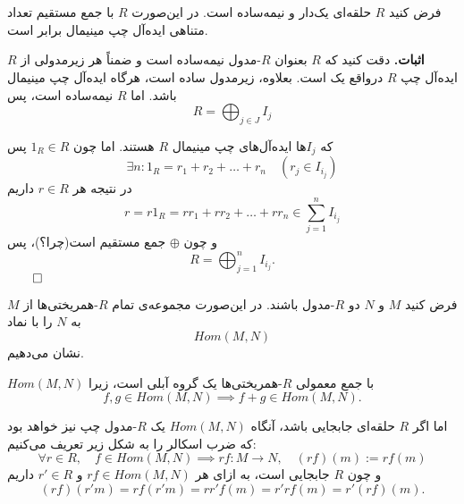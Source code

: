 \section{}


\begin{frame}
    \begin{theorem}
        فرض کنید \( R \) حلقه‌ای یک‌دار و نیمه‌ساده است. در این‌صورت \( R \) با جمع مستقیم تعداد متناهی ایده‌آل چپ مینیمال برابر است.
    \end{theorem}

    \textbf{اثبات.} دقت کنید که \( R \) بعنوان \( R \)-مدول نیمه‌ساده است و ضمناً هر زیرمدولی از \( R \) ایده‌آل چپ
    \( R \)
    درواقع یک
    است.
    بعلاوه، زیرمدول ساده است، هرگاه ایده‌آل چپ مینیمال باشد.
    اما
    \( R \) نیمه‌ساده‌ است، پس
    \[
        R = \bigoplus_{j \in J} I_j
    \]

\end{frame}

\begin{frame}
    که \( I_j \)ها ایده‌آل‌های چپ مینیمال \( R \) هستند. اما چون \( 1_R \in R \) پس
    \[
        \exists n : 1_R = r_1 + r_2 + \dots + r_n \quad (r_j \in I_{i_j})
    \]
    در نتیجه هر \( r \in R \) داریم
    \[
        r = r 1_R = r r_1 + r r_2 + \dots + r r_n \in \sum_{j=1}^n I_{i_j}
    \]
    و چون \( \oplus \) جمع مستقیم است(چرا؟)، پس
    \[
        R = \bigoplus_{j=1}^n I_{i_j}.
    \]
    \hfill\(\qed\)

\end{frame}


\begin{frame}
    \begin{definition}
        فرض کنید \( M \) و \( N \) دو \( R \)-مدول باشند. در این‌صورت مجموعه‌ی تمام \( R \)-همریختی‌ها از \( M \) به \( N \) را با نماد
        \[
            Hom(M,N)
        \]
        نشان می‌دهیم.

    \end{definition}
\end{frame}


\begin{frame}
    \begin{remark}
        \( Hom(M,N) \) با جمع معمولی \( R \)-همریختی‌ها یک گروه آبلی است، زیرا
        \[
            f,g \in Hom(M,N) \implies f+g \in Hom(M,N).
        \]


        اما اگر \( R \) حلقه‌ای جابجایی باشد، آنگاه \( Hom(M,N) \) یک \( R \)-مدول چپ نیز خواهد بود که ضرب اسکالر را به شکل زیر تعریف می‌کنیم:
        \[
            \forall r \in R, \quad f \in Hom(M,N) \implies rf:M\to N, \quad(rf)(m) := r f(m)
        \]
        و چون \( R \) جابجایی است، به ازای هر
        \(rf \in Hom(M,N)\)
        و
        \(r' \in R\)
        داریم
        \[
            (rf)(r'm) = r f(r'm) = r r' f(m) = r' r f(m) = r'(rf)(m).
        \]

    \end{remark}


\end{frame}



